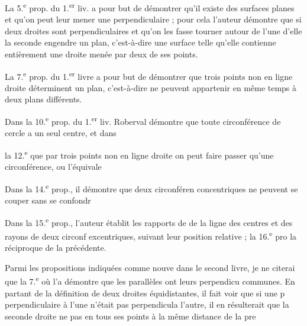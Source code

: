 \documentclass[11pt,a4paper]{article}
\begin{document}
La 5.\textsuperscript{e} prop. du 1.\textsuperscript{er} liv. a pour but de démontrer qu'il existe des surfaces planes et qu'on peut leur mener une perpendiculaire ; pour cela l'auteur démontre que si deux droites sont perpendiculaires et qu'on les fasse tourner autour de l'une d'elle la seconde engendre un plan, c'est-à-dire une surface telle qu'elle contienne entièrement une droite menée par deux de ses points.

La 7.\textsuperscript{e} prop. du 1.\textsuperscript{er} livre a pour but de démontrer que trois points non en ligne droite déterminent un plan, c'est-à-dire ne peuvent appartenir en même temps à deux plans différents.

Dans la 10.\textsuperscript{e} prop. du 1.\textsuperscript{er} liv. Roberval démontre que toute circonférence de cercle a un seul centre, et dans


la 12.\textsuperscript{e} que par trois points non en ligne droite on\ill{} peut faire passer qu'une circonférence, ou l'équivale\ill{}

Dans la 14.\textsuperscript{e} prop., il démontre que deux circonféren concentriques ne peuvent se couper sans se confondr

Dans la 15.\textsuperscript{e} prop., l'auteur établit les rapports de \ill{} de la ligne des centres et des rayons de deux circonf excentriques, suivant leur position relative ; la 16.\textsuperscript{e} pro\ill{}
la réciproque de la précédente.

Parmi les propositions indiquées comme nouve
dans le second livre, je ne citerai que la 7.\textsuperscript{e} où l'a démontre que les parallèles ont leurs perpendicu communes. En partant de la définition de deux droites équidistantes, il fait voir que si une p\ill{} perpendiculaire à l'une n'était pas perpendicula \ill{} l'autre, il en résulterait que la seconde droite ne \ill{} pas en tous ses points à la même distance de la pre
\end{document}

